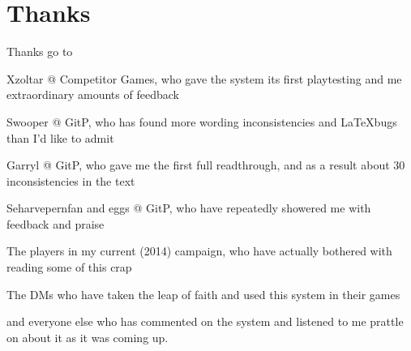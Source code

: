 \section{Thanks}
Thanks go to 
\begin{list}{}{\leftmargin=1em}
 \item Xzoltar @ Competitor Games, who gave the system its first playtesting and me extraordinary amounts of feedback
 \item Swooper @ GitP, who has found more wording inconsistencies and \LaTeX bugs than I'd like to admit
 \item Garryl @ GitP, who gave me the first full readthrough, and as a result about 30 inconsistencies in the text
 \item Seharvepernfan and eggs @ GitP, who have repeatedly showered me with feedback and praise
 \item The players in my current (2014) campaign, who have actually bothered with reading some of this crap
 \item The DMs who have taken the leap of faith and used this system in their games
 \item and everyone else who has commented on the system and listened to me prattle on about it as it was coming up.
\end{list}
